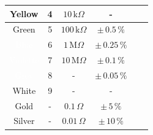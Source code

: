 \begin{frame}
{\begin{figure}[H]
\begin{minipage}[b]{1\textwidth}
{\begin{tabular}{|c|c|c|c|c|c|}
						\hline %
						\cellcolor{yellow}Yellow                        & 4                      & $10\,\text{k}\Omega$   & -                 \\ %
						\hline %
						\cellcolor{green}Green                         & 5                      & $100\,\text{k}\Omega$  & $\pm\, 0.5\,\%$   \\ %
						\hline %
						\cellcolor{blue}\textcolor{white}{Blue}       & 6                      & $1\,\text{M}\Omega$    & $\pm\, 0.25\,\%$  \\ %
						\hline %
						\cellcolor{violet}\textcolor{white}{Violette}  & 7                      & $10\,\text{M}\Omega$   & $\pm\, 0.1\,\%$   \\ %
						\hline %
						\cellcolor{gray}\textcolor{white}{Grey}       & 8                      & -                      & $\pm\, 0.05\,\%$  \\ %
						\hline %
						White                                          & 9                      & -                      & -                 \\ %
						\hline %
						\cellcolor{gold}Gold                          & -                      & $0.1\,\Omega$          & $\pm\,5\,\%$      \\ %
						\hline %
						\cellcolor{silver}Silver                      & -                      & $0.01\,\Omega$         & $\pm\,10\,\%$     \\ %
						\hline %
					\end{tabular}%
				}
			\end{minipage}
		\end{figure}
		
}
\end{frame}
